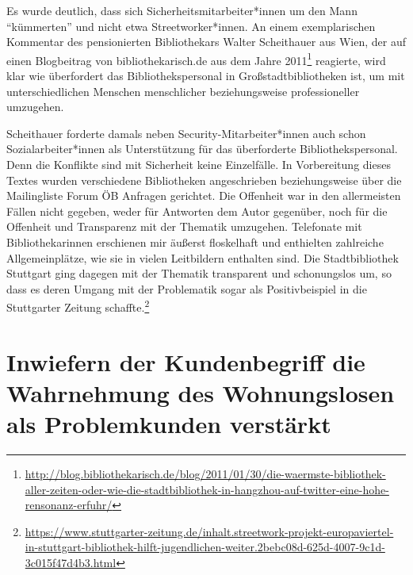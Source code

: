 \documentclass[a4paper,
fontsize=11pt,
oneside,
numbers=noperiodatend,
parskip=half-,
bibliography=totoc,
final
]{scrartcl}
\begin{document}
Es wurde deutlich, dass sich Sicherheitsmitarbeiter*innen um den Mann
\enquote{kümmerten} und nicht etwa Streetworker*innen. An einem
exemplarischen Kommentar des pensionierten Bibliothekars Walter
Scheithauer aus Wien, der auf einen Blogbeitrag von bibliothekarisch.de
aus dem Jahre 2011\footnote{\url{http://blog.bibliothekarisch.de/blog/2011/01/30/die-waermste-bibliothek-aller-zeiten-oder-wie-die-stadtbibliothek-in-hangzhou-auf-twitter-eine-hohe-rensonanz-erfuhr/}}
reagierte, wird klar wie überfordert das Bibliothekspersonal in
Großstadtbibliotheken ist, um mit unterschiedlichen Menschen
menschlicher beziehungsweise professioneller umzugehen.

Scheithauer forderte damals neben Security-Mitarbeiter*innen auch schon
Sozialarbeiter*innen als Unterstützung für das überforderte
Bibliothekspersonal. Denn die Konflikte sind mit Sicherheit keine
Einzelfälle. In Vorbereitung dieses Textes wurden verschiedene
Bibliotheken angeschrieben beziehungsweise über die Mailingliste Forum
ÖB Anfragen gerichtet. Die Offenheit war in den allermeisten Fällen
nicht gegeben, weder für Antworten dem Autor gegenüber, noch für die
Offenheit und Transparenz mit der Thematik umzugehen. Telefonate mit
Bibliothekarinnen erschienen mir äußerst floskelhaft und enthielten
zahlreiche Allgemeinplätze, wie sie in vielen Leitbildern enthalten
sind. Die Stadtbibliothek Stuttgart ging dagegen mit der Thematik
transparent und schonungslos um, so dass es deren Umgang mit der
Problematik sogar als Positivbeispiel in die Stuttgarter Zeitung
schaffte.\footnote{\url{https://www.stuttgarter-zeitung.de/inhalt.streetwork-projekt-europaviertel-in-stuttgart-bibliothek-hilft-jugendlichen-weiter.2bebc08d-625d-4007-9c1d-3c015f47d4b3.html}}

\hypertarget{inwiefern-der-kundenbegriff-die-wahrnehmung-des-wohnungslosen-als-problemkunden-verstuxe4rkt}{%
\section{Inwiefern der Kundenbegriff die Wahrnehmung des
Wohnungslosen als Problemkunden
verstärkt}\label{inwiefern-der-kundenbegriff-die-wahrnehmung-des-wohnungslosen-als-problemkunden-verstuxe4rkt}}
\end{document}
